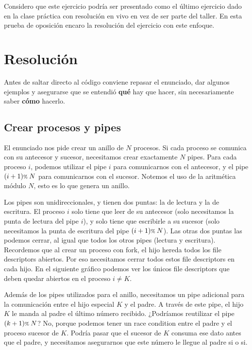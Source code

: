 Considero que este ejercicio podría ser presentado como el último ejercicio dado en la clase práctica con resolución en vivo en vez de ser parte del taller. En esta prueba de oposición encaro la resolución del ejercicio con este enfoque.

\section*{Resolución}

Antes de saltar directo al código conviene repasar el enunciado, dar algunos ejemplos y asegurarse que se entendió \textbf{qué} hay que hacer, sin necesariamente saber \textbf{cómo} hacerlo.


\subsection*{Crear procesos y pipes}

El enunciado nos pide crear un anillo de $N$ procesos. Si cada proceso se comunica con su antecesor y sucesor, necesitamos crear exactamente $N$ pipes. Para cada proceso $i$, podemos utilizar el pipe $i$ para comunicarnos con el antecesor, y el pipe $(i+1) \text{\scriptsize\%\;} N$ para comunicarnos con el sucesor. Notemos el uso de la aritmética módulo $N$, esto es lo que genera un anillo.

Los pipes son unidireccionales, y tienen dos puntas: la de lectura y la de escritura. El proceso $i$ solo tiene que leer de su antecesor (solo necesitamos la punta de lectura del pipe $i$), y solo tiene que escribirle a su sucesor (solo necesitamos la punta de escritura del pipe $(i+1) \text{\scriptsize\%\;} N$). Las otras dos puntas las podemos cerrar, al igual que todos los otros pipes (lectura y escritura). Recordemos que al crear un proceso con fork, el hijo hereda todos los file descriptors abiertos. Por eso necesitamos cerrar todos estos file descriptors en cada hijo. En el siguiente gráfico podemos ver los únicos file descriptors que deben quedar abiertos en el proceso $i \neq K$.



Además de los pipes utilizados para el anillo, necesitamos un pipe adicional para la comunicación entre el hijo especial $K$ y el padre. A través de este pipe, el hijo $K$ le manda al padre el último número recibido. ¿Podríamos reutilizar el pipe $(k+1) \text{\scriptsize\%\;} N$? No, porque podemos tener un race condition entre el padre y el proceso sucesor de $K$. Podría pasar que el sucesor de $K$ consuma ese dato antes que el padre, y necesitamos asegurarnos que este número le llegue al padre si o si.

